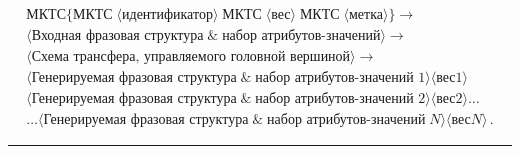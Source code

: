 \noindent
     \begin{multline*}
\mbox{МКТС} 
\{\mbox{МКТС}\;\langle\mbox{идентификатор}\rangle\;\mbox{МКТС}\;\langle
\mbox{вес}\rangle\;\mbox{МКТС}\;\langle\mbox{метка}\rangle \}\rightarrow{}\\
     \langle\mbox{Входная фразовая структура}\;\&\;\mbox{набор 
атрибутов-значений}\rangle\rightarrow{}\\
     \langle\mbox{Схема трансфера, управляемого головной 
вершиной}\rangle\rightarrow{}\\
\langle\mbox{Генерируемая фразовая структура}\;\&\;\mbox{набор 
атрибутов-значений 1}\rangle\langle\mbox{вес1}\rangle\\
\langle\mbox{Генерируемая фразовая структура}\;\&\;\mbox{набор 
атрибутов-значений 2}\rangle\langle\mbox{вес2}\rangle\ldots\\ 
\ldots\langle\mbox{Генерируемая фразовая структура}\;\&\;\mbox{набор 
атрибутов-значений}\;N\rangle\langle\mbox{вес}N\rangle\,.
\end{multline*}

\hrule

